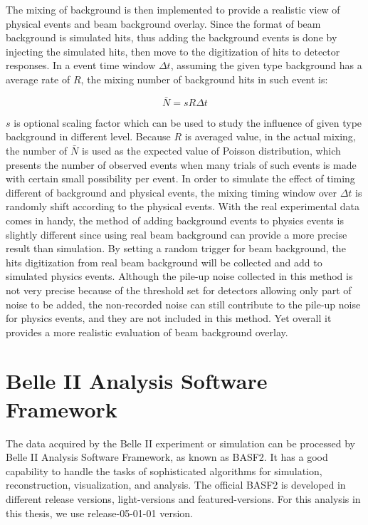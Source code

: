 The mixing of background is then implemented to provide a realistic view of physical events and beam background overlay. Since the format of beam background is simulated hits, thus adding the background events is done by injecting the simulated hits, then move to the digitization of hits to detector responses. In a event time window $\Delta t$, assuming the given type background has a average rate of $R$, the mixing number of background hits in such event is: 

\begin{equation}
\bar{N} = sR\Delta{t}
\end{equation}

$s$ is optional scaling factor which can be used to study the influence of given type background in different level. Because $R$ is averaged value, in the actual mixing, the number of $\bar{N}$ is used as the expected value of Poisson distribution, which presents the number of observed events when many trials of such events is made with certain small possibility per event.  In order to simulate the effect of timing different of background and physical events, the mixing timing window over $\Delta t$ is randomly shift according to the physical events.
With the real experimental data comes in handy, the method of adding background events to physics events is slightly different since using real beam background can provide a more precise result than simulation. By setting a random trigger for beam background, the hits digitization from real beam background will be collected and add to simulated physics events. Although the pile-up noise collected in this method is not very precise because of the threshold set for detectors allowing only part of noise to be added, the non-recorded noise can still contribute to the pile-up noise for physics events, and they are not included in this method. Yet overall it provides a more realistic evaluation of beam background overlay.

\section{Belle II Analysis Software Framework} 
The data acquired by the Belle II experiment or simulation can be processed by  Belle II Analysis Software Framework, as known as BASF2. It has a good capability to handle the tasks of sophisticated algorithms for simulation, reconstruction, visualization, and analysis. The official BASF2 is developed in different release versions, light-versions and featured-versions. For this analysis in this thesis, we use release-05-01-01 version.


